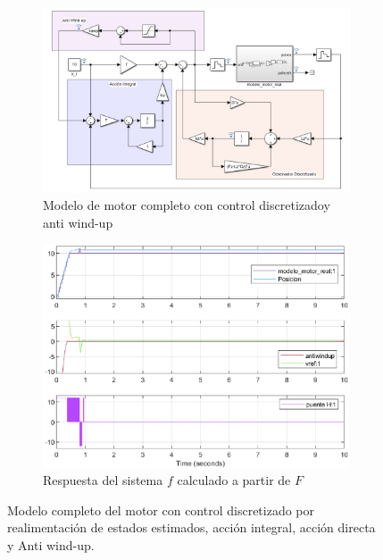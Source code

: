 \documentclass[10pt,a4paper]{report}
\begin{document}
\begin{figure}
\centering
\begin{subfigure}{0.6\textwidth}
\includegraphics[width=\textwidth]{antiwindup.jpg}
\caption{Modelo de motor completo con control discretizadoy anti wind-up}
\label{f36a}
\end{subfigure}
\begin{subfigure}{0.6\textwidth}
\includegraphics[width=\textwidth]{antiwindup.eps}
\caption{Respuesta del sistema $f$ calculado a partir de $F$}
\label{f36b}
\end{subfigure}
\caption{Modelo completo del motor con control discretizado por realimentación de estados estimados, acción integral, acción directa y Anti wind-up.}
\end{figure}
\end{document}
